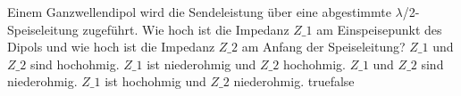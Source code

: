     {Einem Ganzwellendipol wird die Sendeleistung über eine abgestimmte $\lambda$/2-Speiseleitung zugeführt. Wie hoch ist die Impedanz $Z\_1$ am Einspeisepunkt des Dipols und wie hoch ist die Impedanz $Z\_2$ am Anfang der Speiseleitung?}
    {$Z\_1$ und $Z\_2$ sind hochohmig.}
    {$Z\_1$ ist niederohmig und $Z\_2$ hochohmig.}
    {$Z\_1$ und $Z\_2$ sind niederohmig.}
    {$Z\_1$ ist hochohmig und $Z\_2$ niederohmig.}
    {true}{false}